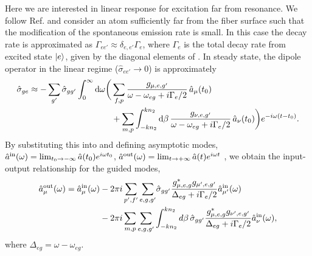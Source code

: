 \documentclass[preprint, aps,pra,onecolumn]{revtex4-1} %
\newcommand{\inp}{{\rm in}}
\newcommand{\out}{{\rm out}}
\newcommand{\comment}[1]{{\color{Maroon} #1}}
\begin{document}
Here we are interested in linear response for excitation far from resonance. We follow Ref. \cite{le_kien_propagation_2014} and consider an atom sufficiently far from the fiber surface such that the modification of the spontaneous emission rate is small.   In this case the decay rate is approximated as $\Gamma_{ee'} \approx \delta_{e,e'} \Gamma_{e}$, where $\Gamma_e$ is the total decay rate from excited state $\lvert{e}\rangle$, given by the diagonal elements of .  In steady state, the dipole operator in the linear regime ($\hat{\sigma}_{ee'} \rightarrow 0 $) is approximately
	\begin{align}
		\hat{\sigma}_{ge} \approx -\sum_{g'} \hat{\sigma}_{gg'}\int_0^{\infty}\mathrm{d}\omega \bigg( & \sum_{f,p}  
\frac{g_{\mu, e,g'}}{\omega-\omega_{eg} + i \Gamma_{e}/2  }\, \hat{a}_\mu (t_0) \\
	&+\sum_{m,p} \int_{-kn_2}^{kn_2}\mathrm{d}\beta \, \frac{g_{\nu, e,g'}}{\omega-\omega_{eg} + i \Gamma_{e}/2 } \,\hat{a}_\nu (t_0)  \bigg)e^{-i\omega (t-t_0)} . \nonumber
	\end{align}
By substituting this into  and defining asymptotic modes, $\hat{a}^{\inp}(\omega) = \lim_{t_0\rightarrow -\infty} \hat{a}(t_0) e^{i\omega t_0}$, $\hat{a}^{\out}(\omega) = \lim_{t\rightarrow +\infty} \hat{a}(t) e^{i\omega t}$ \cite{fan_input-output_2010}, we obtain the input-output relationship for the guided modes,
	\begin{align} \label{Eq::aout}
		\hat{a}^{\out}_\mu (\omega) = \hat{a}^{\inp}_\mu (\omega) &- 2\pi i\sum_{p',f'} 
\sum_{e,g,g'}\!\hat{\sigma}_{gg'}\frac{ g_{\mu,e,g}^* g_{\mu',e,g'}}{ \Delta_{eg} + i \Gamma_{e}/2 }\hat{a}^{\inp}_{\mu'}(\omega) \\
&- 2\pi i\sum_{m,p} \sum_{e,g,g'} \int^{kn_2}_{-kn_2} d\beta \,\hat{\sigma}_{gg'}\frac{ g_{\mu,e,g}^* g_{\nu',e,g'}}{ \Delta_{eg} + i \Gamma_{e}/2 }\hat{a}^{\inp}_{\nu}(\omega),\nn
	\end{align}
where $\Delta_{eg} = \omega - \omega_{eg}$. 
\end{document}
